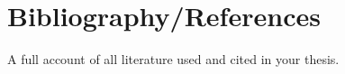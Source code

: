 
	\chapter{Bibliography/References}
	A full account of all literature used and cited in your thesis.

